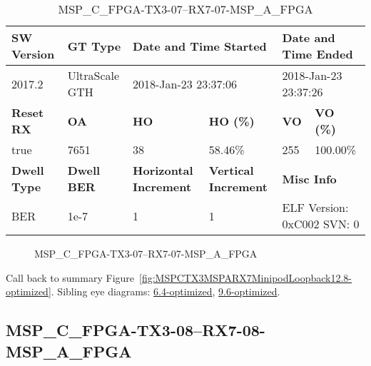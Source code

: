 \begin{table}[h]
\centering
\caption{MSP\_C\_FPGA-TX3-07--RX7-07-MSP\_A\_FPGA}
\label{tab:MSPCFPGATX307RX707MSPAFPGA12.8-optimized}
\begin{tabular}{@{}|l|l|l|l|l|l|@{}}
\toprule
\textbf{SW Version}                & \textbf{GT Type}   & \multicolumn{2}{l|}{\textbf{Date and Time Started}}            & \multicolumn{2}{l|}{\textbf{Date and Time Ended}}        \\ \midrule
2017.2                       & UltraScale GTH          & \multicolumn{2}{l|}{2018-Jan-23 23:37:06}                   & \multicolumn{2}{l|}{2018-Jan-23 23:37:26}               \\ \midrule
\textbf{Reset RX}                  & \textbf{OA} & \textbf{HO}   & \textbf{HO (\%)} & \textbf{VO} & \textbf{VO (\%)} \\ \midrule
true & 7651        & 38          & 58.46\%        & 255        & 100.00\%       \\ \midrule
\textbf{Dwell Type}                & \textbf{Dwell BER} & \textbf{Horizontal Increment} & \textbf{Vertical Increment}    & \multicolumn{2}{l|}{\textbf{Misc Info}}                  \\ \midrule
BER                            & 1e-7        & 1        & 1           & \multicolumn{2}{l|}{ELF Version: 0xC002 SVN: 0}                         \\ \bottomrule
\end{tabular}
\end{table}

\begin{figure}[h]
\caption{MSP\_C\_FPGA-TX3-07--RX7-07-MSP\_A\_FPGA} \label{fig:MSPCFPGATX307RX707MSPAFPGA12.8-optimized}
\end{figure}

Call back to summary Figure~\ref{fig:MSPCTX3MSPARX7MinipodLoopback12.8-optimized}.
Sibling eye diagrams: \hyperref[sec:MSPCFPGATX307RX707MSPAFPGA6.4-optimized]{6.4-optimized}, \hyperref[sec:MSPCFPGATX307RX707MSPAFPGA9.6-optimized]{9.6-optimized}.

\clearpage
\newpage


\subsection{MSP\_C\_FPGA-TX3-08--RX7-08-MSP\_A\_FPGA}\label{sec:MSPCFPGATX308RX708MSPAFPGA12.8-optimized}

